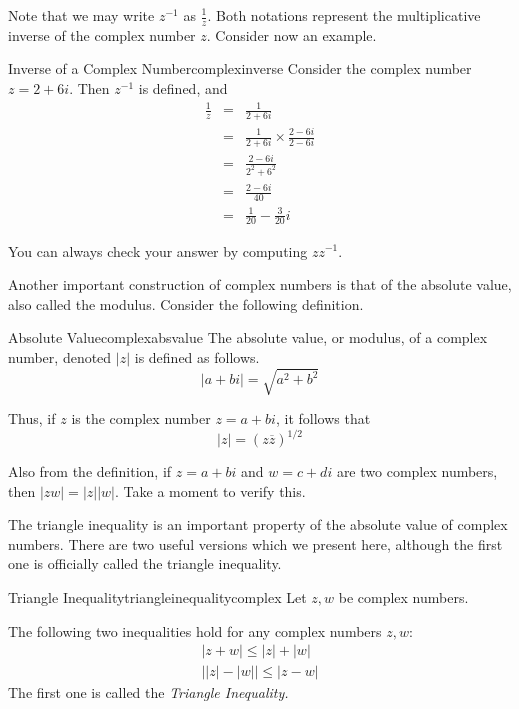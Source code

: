 Note that we may write $z^{-1}$ as $\frac{1}{z}$. Both notations represent the multiplicative inverse of the complex number $z$. Consider now an example.

\begin{example}{Inverse of a Complex Number}{complexinverse}
Consider the complex number $z = 2 + 6i$. Then $z^{-1}$ is defined, and
\begin{eqnarray*}
 \frac{1}{z} &=& \frac{1}{2+6i}\\
 &=& \frac{1}{2+6i}\times \frac{2-6i}{2-6i} \\
 &=& \frac{2-6i}{2^2+6^2} \\
 &=& \frac{2-6i}{40} \\
 &=& \frac{1}{20} -  \frac{3}{20}i
\end{eqnarray*}

You can always check your answer by computing $zz^{-1}$.
\end{example}

Another important construction of complex numbers is that of the absolute value, also called the modulus. Consider the following definition. 

\begin{definition}{Absolute Value}{complexabsvalue}
%
The absolute
value, or modulus, of a complex number, denoted $\left| z \right|$ is defined as follows.
\begin{equation*}
\left| a+bi\right| =
\sqrt{a^{2}+b^{2}}
\end{equation*}
\end{definition}

Thus, if $z$ is the complex number $z=a+bi$, it follows that
\begin{equation*}
\left| z\right| =\left( z\overline{z}\right) ^{1/2}
\end{equation*}

Also from the definition, if $z=a+bi$ and $w=c+di$ are two complex numbers,
then $\left\vert zw\right\vert =\left\vert z\right\vert \left\vert
w\right\vert .$ Take a moment to verify this.

The triangle inequality is an important property of the absolute value
of complex numbers. There are two useful versions which we present
here, although the first one is officially called the triangle inequality. 

\begin{proposition}{Triangle Inequality}{triangleinequalitycomplex}
Let $z,w$ be complex numbers. 

The following two inequalities hold for any  complex numbers $z,w$:
\begin{equation*}
\begin{array}{l}
\left| z+w\right| \leq \left| z\right| +\left| w\right|  \\
\left| \left| z\right| -\left| w\right| \right| \leq \left| z-w\right| 
\end{array}
\end{equation*}
The first one is called the \em{Triangle Inequality}.
\end{proposition}

